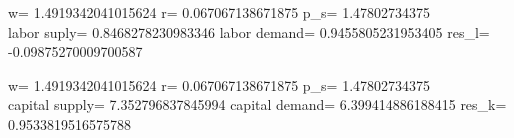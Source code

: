 \documentclass[a4paper, 12pt]{ctexart}
\begin{document}
\begin{figure}[h]
    \centering
    \nonumber
\end{figure}

w= 1.4919342041015624 r= 0.067067138671875 p\_s= 1.47802734375 \\labor suply= 0.8468278230983346 labor demand= 0.9455805231953405 res\_l= -0.09875270009700587

w= 1.4919342041015624 r= 0.067067138671875 p\_s= 1.47802734375 \\capital supply= 7.352796837845994 capital demand= 6.399414886188415 res\_k= 0.9533819516575788
\end{document}
